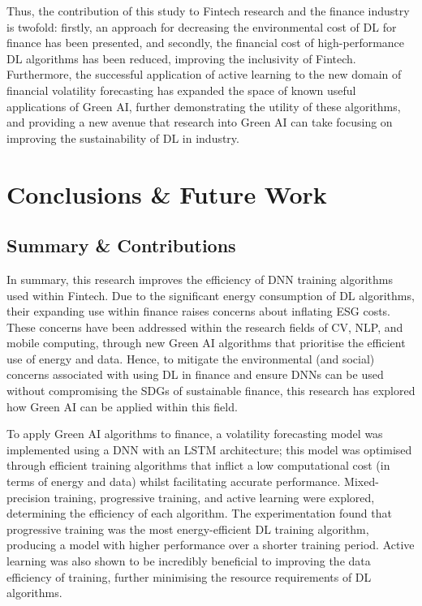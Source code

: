\documentclass[a4paper, 11pt]{report}
\begin{document}
    Thus, the contribution of this study to Fintech research and the finance industry is twofold: firstly, an approach for decreasing the environmental cost of DL for finance has been presented, and secondly, the financial cost of high-performance DL algorithms has been reduced, improving the inclusivity of Fintech. Furthermore, the successful application of active learning to the new domain of financial volatility forecasting has expanded the space of known useful applications of Green AI, further demonstrating the utility of these algorithms, and providing a new avenue that research into Green AI can take focusing on improving the sustainability of DL in industry.


    \newpage
    \chapter{Conclusions \& Future Work}
    \label{chapter: conclusion}

    \section{Summary \& Contributions}

    In summary, this research improves the efficiency of DNN training algorithms used within Fintech. Due to the significant energy consumption of DL algorithms, their expanding use within finance raises concerns about inflating ESG costs. These concerns have been addressed within the research fields of CV, NLP, and mobile computing, through new Green AI algorithms that prioritise the efficient use of energy and data. Hence, to mitigate the environmental (and social) concerns associated with using DL in finance and ensure DNNs can be used without compromising the SDGs of sustainable finance, this research has explored how Green AI can be applied within this field.

    To apply Green AI algorithms to finance, a volatility forecasting model was implemented using a DNN with an LSTM architecture; this model was optimised through efficient training algorithms that inflict a low computational cost (in terms of energy and data) whilst facilitating accurate performance. Mixed-precision training, progressive training, and active learning were explored, determining the efficiency of each algorithm. The experimentation found that progressive training was the most energy-efficient DL training algorithm, producing a model with higher performance over a shorter training period. Active learning was also shown to be incredibly beneficial to improving the data efficiency of training, further minimising the resource requirements of DL algorithms.
\end{document}
